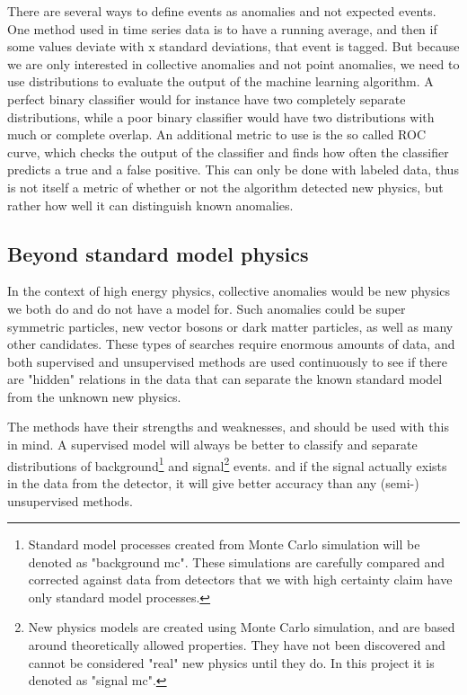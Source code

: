 \documentclass[ reprint, amsmath,amssymb, aps, nofootinbib]{revtex4-2}
\begin{document}
There are several ways to define events as anomalies and not expected events. One method used in time series data is to have a running average, and then if some values deviate with x standard deviations, that event is tagged. But because we are only interested in collective anomalies and not point anomalies, we need to use distributions to evaluate the output of the machine learning algorithm. A perfect binary classifier would for instance have two completely separate distributions, while a poor binary classifier would have two distributions with much or complete overlap. An additional metric to use is the so called ROC curve, which checks the output of the classifier and finds how often the classifier predicts a true and a false positive. This can only be done with labeled data, thus is not itself a metric of whether or not the algorithm detected new physics, but rather how well it can distinguish known anomalies.

\subsection{Beyond standard model physics}



In the context of high energy physics, collective anomalies would be new physics we both do and do not have a model for.
Such anomalies could be super symmetric particles\cite{JMLR:v18:16-558}, new vector bosons or dark matter particles, as well as many other candidates. These types of searches require enormous amounts of data, and both supervised and unsupervised methods are used continuously to see if there are "hidden" relations in the data that can separate the known standard model from the unknown new physics. \par 

The methods have their strengths and weaknesses, and should be used with this in mind. A supervised model will always be better to classify and separate distributions of background\footnote{Standard model processes created from Monte Carlo simulation will be denoted as "background mc". These simulations are carefully compared and corrected against data from detectors that we with high certainty claim have only standard model processes.} and signal\footnote{New physics models are created using Monte Carlo simulation, and are based around theoretically allowed properties. They have not been discovered and cannot be considered "real" new physics until they do. In this project it is denoted as "signal mc".} events. and if the signal actually exists in the data from the detector, it will give better accuracy than any (semi-) unsupervised methods. \par 
\end{document}
